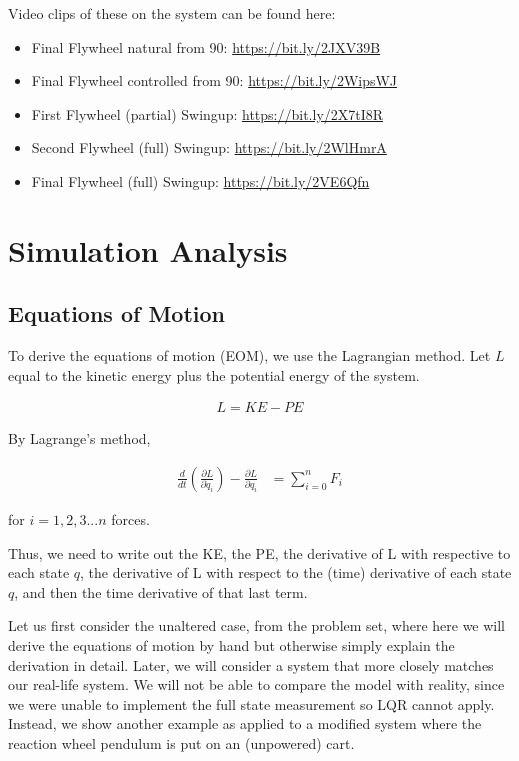 \documentclass[conference]{IEEEtran}
\begin{document}
Video clips of these on the system can be found here:
\begin{itemize}
    \item Final Flywheel natural from 90: \url{https://bit.ly/2JXV39B}
    \item Final Flywheel controlled from 90: \url{https://bit.ly/2WipsWJ}
    \item First Flywheel (partial) Swingup: \url{https://bit.ly/2X7tI8R}
    \item Second Flywheel (full) Swingup: \url{https://bit.ly/2WlHmrA}
    \item Final Flywheel (full) Swingup: \url{https://bit.ly/2VE6Qfn}
\end{itemize}


\section{Simulation Analysis}

\subsection{Equations of Motion}

To derive the equations of motion (EOM), we use the Lagrangian method. Let $L$
equal to the kinetic energy plus the potential energy of the system.


\begin{align}
    L = KE - PE
\end{align}

By Lagrange's method,

\begin{align}
    \frac{d}{dt} (\frac{\partial{L}}{\partial \dot{q}_i}) -
    \frac{\partial{L}}{\partial q_i}  &= \sum_{i=0}^{n} F_i
\end{align}

for $i = 1,2,3 ... n $ forces.

Thus, we need to write out the KE, the PE, the derivative of L with respective
to each state $q$, the derivative of L with respect to the (time) derivative of
each state $q$, and then the time derivative of that last term.

Let us first consider the unaltered case, from the problem set, where here we
will derive the equations of motion by hand but otherwise simply explain the
derivation in detail. Later, we will consider a system that more closely matches
our real-life system. We will not be able to compare the model with reality,
since we were unable to implement the full state measurement so LQR cannot
apply. Instead, we show another example as applied to a modified system where
the reaction wheel pendulum is put on an (unpowered) cart.
\end{document}
